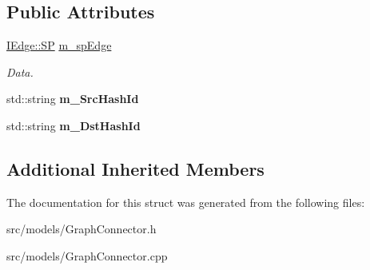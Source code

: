 \subsection*{Public Attributes}
\begin{DoxyCompactItemize}
\item 
\mbox{\label{struct_graph_connector_1_1_create_edge_event_a0d24372d11ddad5942b226ac850b2b04}} 
\hyperlink{class_i_graph_1_1_i_edge_adfae3ec3e377543685a06b9c5d5a776a}{I\+Edge\+::\+SP} \hyperlink{struct_graph_connector_1_1_create_edge_event_a0d24372d11ddad5942b226ac850b2b04}{m\+\_\+sp\+Edge}
\begin{DoxyCompactList}\small\item\em Data. \end{DoxyCompactList}\item 
\mbox{\label{struct_graph_connector_1_1_create_edge_event_a0c9c1793d52cf5817a03bd5834a937d1}} 
std\+::string {\bfseries m\+\_\+\+Src\+Hash\+Id}
\item 
\mbox{\label{struct_graph_connector_1_1_create_edge_event_a98a5288177d64a26e0ab6b9e6d114cdd}} 
std\+::string {\bfseries m\+\_\+\+Dst\+Hash\+Id}
\end{DoxyCompactItemize}
\subsection*{Additional Inherited Members}


The documentation for this struct was generated from the following files\+:\begin{DoxyCompactItemize}
\item 
src/models/Graph\+Connector.\+h\item 
src/models/Graph\+Connector.\+cpp\end{DoxyCompactItemize}
